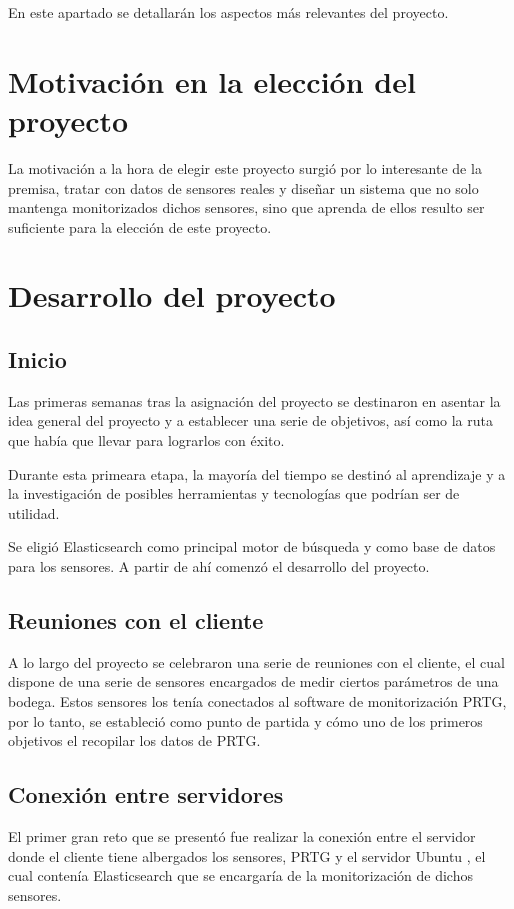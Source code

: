 

En este apartado se detallarán los aspectos más relevantes del proyecto.

\section{Motivación en la elección del proyecto}

La motivación a la hora de elegir este proyecto surgió por lo interesante de la premisa, tratar con datos de sensores reales y diseñar un sistema que no solo mantenga monitorizados dichos sensores, sino que aprenda de ellos resulto ser suficiente para la elección de este proyecto. 

\section{Desarrollo del proyecto}

\subsection{Inicio}

Las primeras semanas tras la asignación del proyecto se destinaron en asentar la idea general del proyecto y a establecer una serie de objetivos, así como la ruta que había que llevar para lograrlos con éxito.

Durante esta primeara etapa, la mayoría del tiempo se destinó al aprendizaje y a la investigación de posibles herramientas y tecnologías que podrían ser de utilidad.

Se eligió Elasticsearch como principal motor de búsqueda y como base de datos para los sensores. A partir de ahí comenzó el desarrollo del proyecto.

\subsection{Reuniones con el cliente}

A lo largo del proyecto se celebraron una serie de reuniones con el cliente, el cual dispone de una serie de sensores encargados de medir ciertos parámetros de una bodega. Estos sensores los tenía conectados al software de monitorización PRTG, por lo tanto, se estableció como punto de partida y cómo uno de los primeros objetivos el recopilar los datos de PRTG. 

\subsection{Conexión entre servidores}
El primer gran reto que se presentó fue realizar la conexión entre el servidor donde el cliente tiene albergados los sensores, PRTG y el servidor Ubuntu , el cual contenía Elasticsearch que se encargaría de la monitorización de dichos sensores. 

